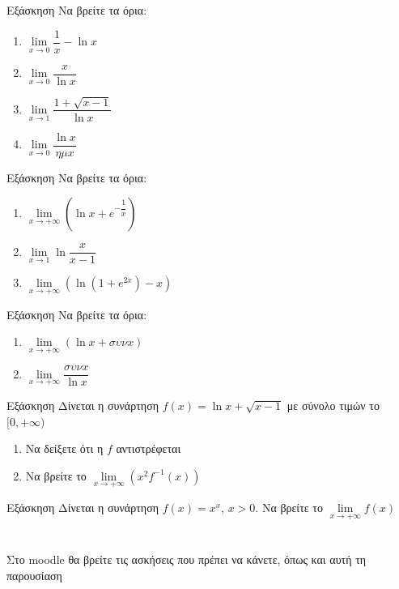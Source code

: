 \documentclass{presentation}
\begin{document}
\begin{frame}{Εξάσκηση}
      Να βρείτε τα όρια:
      \begin{enumerate}
            \item $\lim\limits_{x \to 0}{ \dfrac{1}{x}-\ln x }$ \pause
            \item $\lim\limits_{x \to 0}{ \dfrac{x}{\ln x} }$\pause
            \item $\lim\limits_{x \to 1}{ \dfrac{1+\sqrt{x-1}}{\ln x}}$\pause
            \item $\lim\limits_{x \to 0}{ \dfrac{\ln x}{ημx}}$
      \end{enumerate}
\end{frame}

\begin{frame}{Εξάσκηση}
      Να βρείτε τα όρια:
      \begin{enumerate}
            \item $\lim\limits_{x \to +\infty}{\left(    \ln x + e^{-\dfrac{1}{x}} \right)}$ \pause
            \item $\lim\limits_{x \to 1}{ \ln\dfrac{x}{x-1} }$\pause
            \item $\lim\limits_{x \to +\infty}{\left( \ln (1+e^{2x})-x \right)}$
      \end{enumerate}
\end{frame}

\begin{frame}{Εξάσκηση}
      Να βρείτε τα όρια:
      \begin{enumerate}
            \item $\lim\limits_{x \to +\infty}{\left( \ln x+συνx \right)}$ \pause
            \item $\lim\limits_{x \to +\infty}{ \dfrac{συνx}{\ln x} }$
      \end{enumerate}
\end{frame}

\begin{frame}{Εξάσκηση}
      Δίνεται η συνάρτηση $f(x)=\ln x + \sqrt{x-1}$ με σύνολο τιμών το $[0,+\infty)$
      \begin{enumerate}
            \item Να δείξετε ότι η $f$ αντιστρέφεται \pause
            \item Να βρείτε το $\lim\limits_{x \to +\infty}{ \left( x^2f^{-1}(x) \right)  }$
      \end{enumerate}
\end{frame}

\begin{frame}{Εξάσκηση}
      Δίνεται η συνάρτηση $f(x)=x^x$, $x>0$. Να βρείτε το $\lim\limits_{x \to +\infty}{ f(x)  }$
\end{frame}

\section{}
\begin{frame}
      Στο moodle θα βρείτε τις ασκήσεις που πρέπει να κάνετε, όπως και αυτή τη παρουσίαση
\end{frame}
\end{document}
